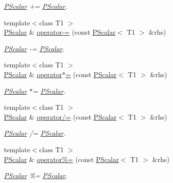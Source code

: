 \begin{DoxyCompactItemize}
\begin{DoxyCompactList}\small\item\em \mbox{\hyperlink{classENSEM_1_1PScalar}{P\+Scalar}} += \mbox{\hyperlink{classENSEM_1_1PScalar}{P\+Scalar}}. \end{DoxyCompactList}\item 
{\footnotesize template$<$class T1 $>$ }\\\mbox{\hyperlink{classENSEM_1_1PScalar}{P\+Scalar}} \& \mbox{\hyperlink{classENSEM_1_1PScalar_a8c0e633dbd87bcb922496bfaf136752c}{operator-\/=}} (const \mbox{\hyperlink{classENSEM_1_1PScalar}{P\+Scalar}}$<$ T1 $>$ \&rhs)
\begin{DoxyCompactList}\small\item\em \mbox{\hyperlink{classENSEM_1_1PScalar}{P\+Scalar}} -\/= \mbox{\hyperlink{classENSEM_1_1PScalar}{P\+Scalar}}. \end{DoxyCompactList}\item 
{\footnotesize template$<$class T1 $>$ }\\\mbox{\hyperlink{classENSEM_1_1PScalar}{P\+Scalar}} \& \mbox{\hyperlink{classENSEM_1_1PScalar_addccfa9164f9d80554657387932185c4}{operator$\ast$=}} (const \mbox{\hyperlink{classENSEM_1_1PScalar}{P\+Scalar}}$<$ T1 $>$ \&rhs)
\begin{DoxyCompactList}\small\item\em \mbox{\hyperlink{classENSEM_1_1PScalar}{P\+Scalar}} $\ast$= \mbox{\hyperlink{classENSEM_1_1PScalar}{P\+Scalar}}. \end{DoxyCompactList}\item 
{\footnotesize template$<$class T1 $>$ }\\\mbox{\hyperlink{classENSEM_1_1PScalar}{P\+Scalar}} \& \mbox{\hyperlink{classENSEM_1_1PScalar_a72bf5e7494fc6c8831d0003f8fb62a16}{operator/=}} (const \mbox{\hyperlink{classENSEM_1_1PScalar}{P\+Scalar}}$<$ T1 $>$ \&rhs)
\begin{DoxyCompactList}\small\item\em \mbox{\hyperlink{classENSEM_1_1PScalar}{P\+Scalar}} /= \mbox{\hyperlink{classENSEM_1_1PScalar}{P\+Scalar}}. \end{DoxyCompactList}\item 
{\footnotesize template$<$class T1 $>$ }\\\mbox{\hyperlink{classENSEM_1_1PScalar}{P\+Scalar}} \& \mbox{\hyperlink{classENSEM_1_1PScalar_ab583ff2667eba7d2bed2acbd3c15e43e}{operator\%=}} (const \mbox{\hyperlink{classENSEM_1_1PScalar}{P\+Scalar}}$<$ T1 $>$ \&rhs)
\begin{DoxyCompactList}\small\item\em \mbox{\hyperlink{classENSEM_1_1PScalar}{P\+Scalar}} \%= \mbox{\hyperlink{classENSEM_1_1PScalar}{P\+Scalar}}. \end{DoxyCompactList}\item 

\end{DoxyCompactItemize}
